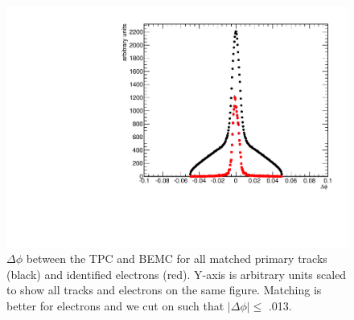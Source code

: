 \begin{figure}[htbp]
\begin{center}
\includegraphics[scale=.75]{Plots/NPE/point_dphi.pdf}
\end{center}
\caption[TPC to BEMC $\Delta\phi$]{$\Delta\phi$ between the TPC and BEMC for all matched primary tracks (black) and identified electrons (red). Y-axis is arbitrary units scaled to show all tracks and electrons on the same figure. Matching is better for electrons and we cut on such that $|\Delta\phi| \leq$ .013.}
\label{fig:point_dphi}
\end{figure}

